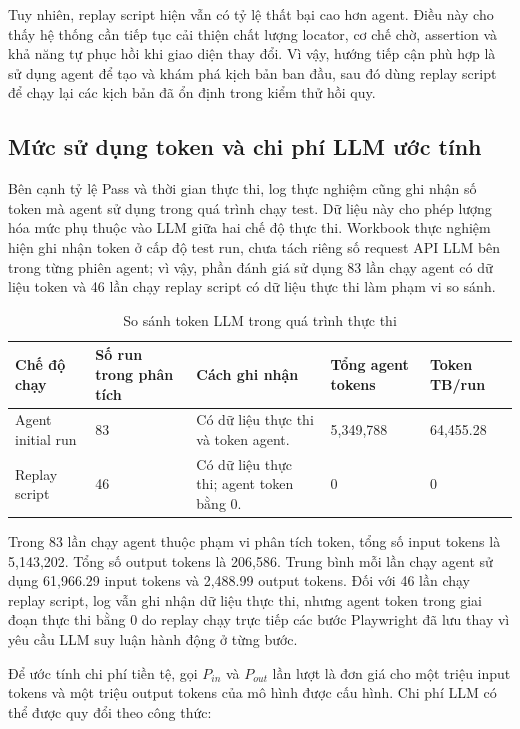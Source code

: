 Tuy nhiên, replay script hiện vẫn có tỷ lệ thất bại cao hơn agent. Điều này cho thấy hệ thống cần tiếp tục cải thiện chất lượng locator, cơ chế chờ, assertion và khả năng tự phục hồi khi giao diện thay đổi. Vì vậy, hướng tiếp cận phù hợp là sử dụng agent để tạo và khám phá kịch bản ban đầu, sau đó dùng replay script để chạy lại các kịch bản đã ổn định trong kiểm thử hồi quy.

\subsection{Mức sử dụng token và chi phí LLM ước tính}

Bên cạnh tỷ lệ Pass và thời gian thực thi, log thực nghiệm cũng ghi nhận số token mà agent sử dụng trong quá trình chạy test. Dữ liệu này cho phép lượng hóa mức phụ thuộc vào LLM giữa hai chế độ thực thi. Workbook thực nghiệm hiện ghi nhận token ở cấp độ test run, chưa tách riêng số request API LLM bên trong từng phiên agent; vì vậy, phần đánh giá sử dụng 83 lần chạy agent có dữ liệu token và 46 lần chạy replay script có dữ liệu thực thi làm phạm vi so sánh.

\begin{table}[H]
\centering
\caption{So sánh token LLM trong quá trình thực thi}
\label{tab:chapter6_agent_replay_token_usage}
\small
\renewcommand{\arraystretch}{1.2}
\begin{tabular}{|p{3.0cm}|C{2.2cm}|p{3.7cm}|C{2.4cm}|C{2.2cm}|}
\hline
\textbf{Chế độ chạy} & \textbf{Số run trong phân tích} & \textbf{Cách ghi nhận} & \textbf{Tổng agent tokens} & \textbf{Token TB/run} \\
\hline
Agent initial run & 83 & Có dữ liệu thực thi và token agent. & 5,349,788 & 64,455.28 \\
\hline
Replay script & 46 & Có dữ liệu thực thi; agent token bằng 0. & 0 & 0 \\
\hline
\end{tabular}
\end{table}

Trong 83 lần chạy agent thuộc phạm vi phân tích token, tổng số input tokens là 5,143,202. Tổng số output tokens là 206,586. Trung bình mỗi lần chạy agent sử dụng 61,966.29 input tokens và 2,488.99 output tokens. Đối với 46 lần chạy replay script, log vẫn ghi nhận dữ liệu thực thi, nhưng agent token trong giai đoạn thực thi bằng 0 do replay chạy trực tiếp các bước Playwright đã lưu thay vì yêu cầu LLM suy luận hành động ở từng bước.

Để ước tính chi phí tiền tệ, gọi $P_{in}$ và $P_{out}$ lần lượt là đơn giá cho một triệu input tokens và một triệu output tokens của mô hình được cấu hình. Chi phí LLM có thể được quy đổi theo công thức:

